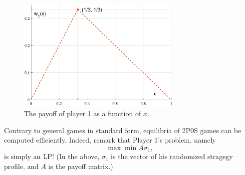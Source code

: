 \begin{example}
\begin{figure}[!ht]
\centering
\includegraphics[width = 0.7\textwidth]{figP2OS.eps}
\caption{The payoff of player 1 as a function of $x$.}
\label{chap3:figP2OS}
\end{figure}


\end{example}
Contrary to general games in standard form, equilibria of 2P0S games can be computed efficiently.  Indeed, remark that Player 1's problem, namely $$ \max{\min{ A \sigma_1}} ,$$ is simply an LP!  (In the above, $\sigma_1$ is the vector of his randomized stragegy profile, and $A$ is the payoff matrix.)


\ifx \globalmark \undefined %


	
\else

\fi
